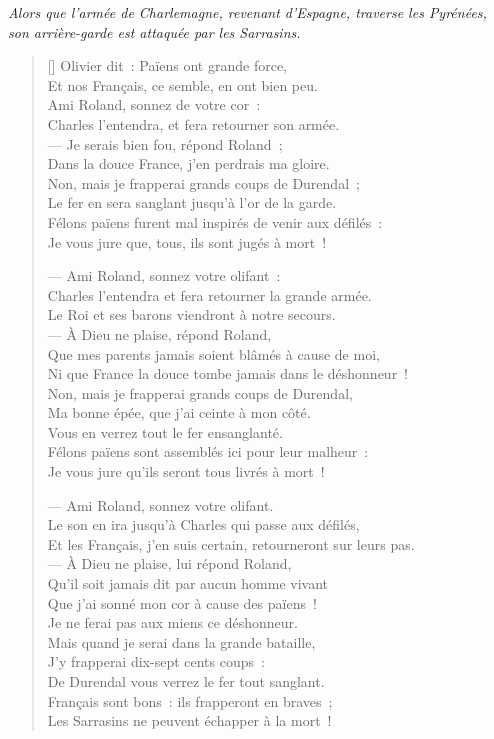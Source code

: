 \documentclass[a4paper,14pt,french]{extarticle}
\begin{document}


\small
\textit{Alors que l'armée de Charlemagne, revenant d'Espagne, traverse les Pyrénées, son arrière-garde est attaquée par les Sarrasins.}
\normalsize

\begin{verse}[\versewidth]
Olivier dit : Païens ont grande force,\\
Et nos Français, ce semble, en ont bien peu.\\
Ami Roland, sonnez de votre cor :\\
Charles l’entendra, et fera retourner son armée.\\
— Je serais bien fou, répond Roland ;\\
Dans la douce France, j’en perdrais ma gloire.\\
Non, mais je frapperai grands coups de Durendal ;\\
Le fer en sera sanglant jusqu’à l’or de la garde.\\
Félons païens furent mal inspirés de venir aux défilés :\\
Je vous jure que, tous, ils sont jugés à mort !

— Ami Roland, sonnez votre olifant :\\
Charles l’entendra et fera retourner la grande armée.\\
Le Roi et ses barons viendront à notre secours.\\
— À Dieu ne plaise, répond Roland,\\
Que mes parents jamais soient blâmés à cause de moi,\\
Ni que France la douce tombe jamais dans le déshonneur !\\
Non, mais je frapperai grands coups de Durendal,\\
Ma bonne épée, que j’ai ceinte à mon côté.\\
Vous en verrez tout le fer ensanglanté.\\
Félons païens sont assemblés ici pour leur malheur :\\
Je vous jure qu’ils seront tous livrés à mort !

— Ami Roland, sonnez votre olifant.\\
Le son en ira jusqu’à Charles qui passe aux défilés,\\
Et les Français, j’en suis certain, retourneront sur leurs pas.\\
— À Dieu ne plaise, lui répond Roland,\\
Qu’il soit jamais dit par aucun homme vivant\\
Que j’ai sonné mon cor à cause des païens !\\
Je ne ferai pas aux miens ce déshonneur.\\
Mais quand je serai dans la grande bataille,\\
J’y frapperai dix-sept cents coups :\\
De Durendal vous verrez le fer tout sanglant.\\
Français sont bons : ils frapperont en braves ;\\
Les Sarrasins ne peuvent échapper à la mort !


\end{verse}
\end{document}
